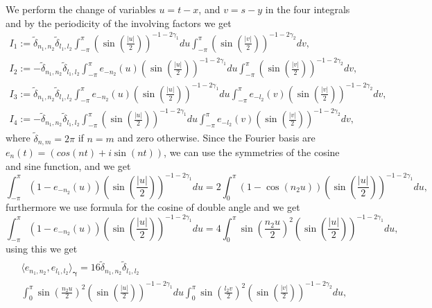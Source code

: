 \documentclass{article}
\begin{document}
We perform the change of variables $u = t-x$, and $v = s-y$ in the four integrals and by the periodicity of the involving factors we get 
\begin{align*}
I_1 := \widetilde{\delta}_{n_1,n_2}\widetilde{\delta}_{l_1,l_2}\int_{-\pi}^{\pi}
\left(\sin\left(\frac{|u|}{2}\right)\right)^{-1-2\gamma_1}du
\int_{-\pi}^{\pi}  
\left(\sin\left(\frac{|v|}{2}\right)\right)^{-1-2\gamma_2}dv,\\
I_2 := -\widetilde{\delta}_{n_1,n_2}\widetilde{\delta}_{l_1,l_2}\int_{-\pi}^{\pi} e_{-n_2}(u)
\left(\sin\left(\frac{|u|}{2}\right)\right)^{-1-2\gamma_1}du
\int_{-\pi}^{\pi}  
\left(\sin\left(\frac{|v|}{2}\right)\right)^{-1-2\gamma_2}dv,\\
I_3 := \widetilde{\delta}_{n_1,n_2}\widetilde{\delta}_{l_1,l_2}\int_{-\pi}^{\pi} e_{-n_2}(u)
\left(\sin\left(\frac{|u|}{2}\right)\right)^{-1-2\gamma_1}du
\int_{-\pi}^{\pi}  e_{-l_2}(v)
\left(\sin\left(\frac{|v|}{2}\right)\right)^{-1-2\gamma_2}dv,\\
I_4 := -\widetilde{\delta}_{n_1,n_2}\widetilde{\delta}_{l_1,l_2}\int_{-\pi}^{\pi} 
\left(\sin\left(\frac{|u|}{2}\right)\right)^{-1-2\gamma_1}du
\int_{-\pi}^{\pi}  e_{-l_2}(v)
\left(\sin\left(\frac{|v|}{2}\right)\right)^{-1-2\gamma_2}dv,
\end{align*}
where $\widetilde{\delta}_{n,m} = 2 \pi $ if $n=m$ and zero otherwise. Since the Fourier basis are $e_n(t) =  (cos(nt) + i \sin (nt)) $, we can use the symmetries of the cosine and sine function, and we get
$$
\int_{-\pi}^{\pi} (1-e_{-n_2}(u))
\left(\sin\left(\frac{|u|}{2}\right)\right)^{-1-2\gamma_1}du = 
2 \int_{0}^{\pi} (1-\cos(n_2 u))
\left(\sin\left(\frac{|u|}{2}\right)\right)^{-1-2\gamma_1}du,
$$
furthermore we use formula for the cosine of double angle and we get
$$
\int_{-\pi}^{\pi} (1-e_{-n_2}(u))
\left(\sin\left(\frac{|u|}{2}\right)\right)^{-1-2\gamma_1}du = 
4 \int_{0}^{\pi} \sin\left(\frac{n_2 u}{2}\right) ^2
\left(\sin\left(\frac{|u|}{2}\right)\right)^{-1-2\gamma_1}du,
$$
using this we get
\begin{align*}
\begin{split}
&\langle e_{n_1,n_2}, e_{l_1,l_2} \rangle_{\mathbf{\gamma}}= 16 \widetilde{\delta}_{n_1,n_2} \widetilde{\delta}_{l_1,l_2}\\ &\int_{0}^{\pi} \sin\left(\frac{n_2 u}{2}\right) ^2
\left(\sin\left(\frac{|u|}{2}\right)\right)^{-1-2\gamma_1}du 
\int_{0}^{\pi} \sin\left(\frac{l_2 v}{2}\right) ^2
\left(\sin\left(\frac{|v|}{2}\right)\right)^{-1-2\gamma_2}du,
\end{split}
\end{align*}
\end{document}
